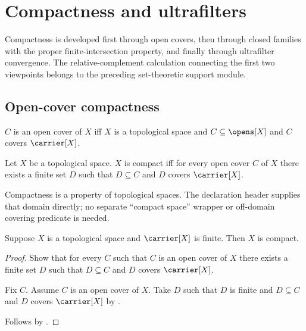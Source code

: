 \section{Compactness and ultrafilters}







Compactness is developed first through open covers, then through closed
families with the proper finite-intersection property, and finally through
ultrafilter convergence.  The relative-complement calculation connecting the
first two viewpoints belongs to the preceding set-theoretic support module.

\subsection{Open-cover compactness}

\begin{definition}\label{open_cover}
    $C$ is an open cover of $X$ iff
        $X$ is a topological space and
        $C\subseteq\opens[X]$ and $C$ covers $\carrier[X]$.
\end{definition}

\begin{definition}\label{is_compact}
    Let $X$ be a topological space.
    $X$ is compact iff for every open cover $C$ of $X$ there exists
        a finite set $D$ such that $D\subseteq C$ and
        $D$ covers $\carrier[X]$.
\end{definition}

Compactness is a property of topological spaces.  The declaration header
supplies that domain directly; no separate ``compact space'' wrapper or
off-domain covering predicate is needed.

\begin{theorem}\label{finite_topological_space_is_compact}
    Suppose $X$ is a topological space and $\carrier[X]$ is finite.
    Then $X$ is compact.
\end{theorem}
\begin{proof}
    Show that for every $C$ such that $C$ is an open cover of $X$
        there exists a finite set $D$ such that $D\subseteq C$ and
        $D$ covers $\carrier[X]$.
    \begin{subproof}
        Fix $C$.
        Assume $C$ is an open cover of $X$.
        Take $D$ such that $D$ is finite and $D\subseteq C$ and
            $D$ covers $\carrier[X]$
            by .
    \end{subproof}
    Follows by .
\end{proof}

